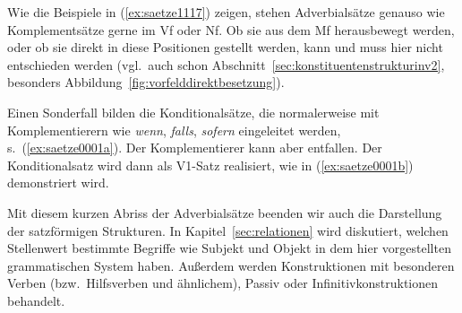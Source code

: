 
Wie die Beispiele in (\ref{ex:saetze1117}) zeigen, stehen Adverbialsätze genauso wie Komplementsätze gerne im Vf oder Nf.
Ob sie aus dem Mf herausbewegt werden, oder ob sie direkt in diese Positionen gestellt werden, kann und muss hier nicht entschieden werden (vgl.\ auch schon Abschnitt~\ref{sec:konstituentenstrukturinv2}, besonders Abbildung~\ref{fig:vorfelddirektbesetzung}).



Einen Sonderfall bilden die Konditionalsätze, die normalerweise mit Komplementierern wie \textit{wenn}, \textit{falls}, \textit{sofern} eingeleitet werden, s.\ (\ref{ex:saetze0001a}).
Der Komplementierer kann aber entfallen.
Der Konditionalsatz wird dann als V1-Satz realisiert, wie in (\ref{ex:saetze0001b}) demonstriert wird.

\begin{exe}
  \ex\label{ex:saetze0001}
  \begin{xlist}
  \end{xlist}
\end{exe}

Mit diesem kurzen Abriss der Adverbialsätze beenden wir auch die Darstellung der satzförmigen Strukturen.
In Kapitel~\ref{sec:relationen} wird diskutiert, welchen Stellenwert bestimmte Begriffe wie Subjekt und Objekt in dem hier vorgestellten grammatischen System haben.
Außerdem werden Konstruktionen mit besonderen Verben (bzw.\ Hilfsverben und ähnlichem), \zB Passiv oder Infinitivkonstruktionen behandelt.

\Zusammenfassung

